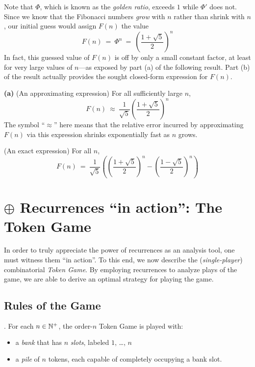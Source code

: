 \smallskip

\noindent
Note that $\Phi$, which is known as the \textit{golden ratio}, exceeds $1$ while $\Phi'$ does not.  Since we know that the Fibonacci numbers {\em grow} with $n$ rather than shrink with $n$, our initial guess would assign $F(n)$ the value
\[ F(n) \ = \ \Phi^n \ = \ {\displaystyle \left( \frac{1+\sqrt{5}}{2} \right)^n } \]
In fact, this guessed value of $F(n)$ is off by only a small constant factor, at least for very large values of $n$---as exposed by part (a) of the following result.  Part (b) of the result actually provides the sought closed-form expression for $F(n)$.

\begin{prop}
\label{thm:FibNo-GoldenRatio}
{\bf (a)} {\rm (An approximating expression)}
For all sufficiently large $n$,
\[ F(n) \ \approx \ \frac{1}{\sqrt{5}} \left(\frac{1+\sqrt{5}}{2} \right)^n \]
The symbol ``$\approx$'' here means that the relative error incurred by approximating $F(n)$ via this expression shrinks exponentially fast as $n$ grows.

\medskip

 {\rm (An exact expression)}
For all $n$,
\[ F(n) \ = \ 
\frac{1}{\sqrt{5}} \left( \left(\frac{1+\sqrt{5}}{2} \right)^n - \left(\frac{1-\sqrt{5}}{2} \right)^n \right)
\]
\end{prop}




\section{$\oplus$ Recurrences ``in action'': The Token Game}
\label{sec:TokenGame}

In order to truly appreciate the power of recurrences as an analysis tool, one must witness them ``in action''.  To this end, we now describe the ({\it single-player}) combinatorial {\it Token Game}.  By employing recurrences to analyze plays of the game, we are able to derive an optimal strategy for playing the game.

\subsection{Rules of the Game}
\label{sec:TokenGame-Rules}

.
For each $n \in \mathbb{N}^+$, the order-$n$ Token Game is played with:
\begin{itemize}
\item
a {\it bank} that has $n$ {\it slots}, labeled $1$, \ldots, $n$
\item
a {\it pile} of $n$ tokens, each capable of completely occupying a bank slot.
\end{itemize}

